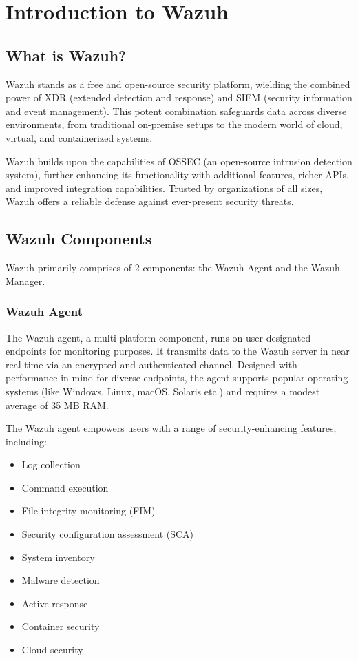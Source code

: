 \section{Introduction to Wazuh}
\subsection{What is Wazuh?}
Wazuh stands as a free and open-source security platform, wielding the combined power of XDR (extended detection and response) and SIEM (security information and event management). This potent combination safeguards data across diverse environments, from traditional on-premise setups to the modern world of cloud, virtual, and containerized systems.

Wazuh builds upon the capabilities of OSSEC (an open-source intrusion detection system), further enhancing its functionality with additional features, richer APIs, and improved integration capabilities. Trusted by organizations of all sizes, Wazuh offers a reliable defense against ever-present security threats.

\subsection{Wazuh Components}
Wazuh primarily comprises of 2 components: the Wazuh Agent and the Wazuh Manager.

\subsubsection{Wazuh Agent}

The Wazuh agent, a multi-platform component, runs on user-designated endpoints for monitoring purposes. It transmits data to the Wazuh server in near real-time via an encrypted and authenticated channel. Designed with performance in mind for diverse endpoints, the agent supports popular operating systems (like Windows, Linux, macOS, Solaris etc.) and requires a modest average of 35 MB RAM.

The Wazuh agent empowers users with a range of security-enhancing features, including:

\begin{itemize}
    \item Log collection
    \item Command execution
    \item File integrity monitoring (FIM)
    \item Security configuration assessment (SCA)
    \item System inventory
    \item Malware detection
    \item Active response
    \item Container security
    \item Cloud security
\end{itemize}


